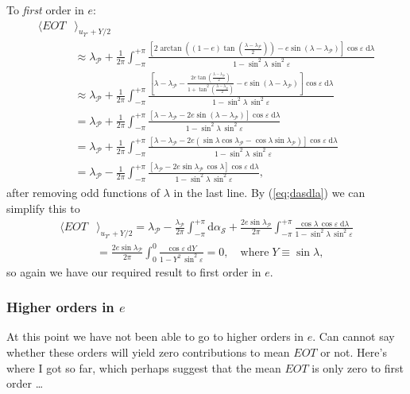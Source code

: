 \documentclass[]{AGUJournal}
\newcommand{\beq}{\begin{equation}}
\newcommand{\eeq}{\end{equation}}
\newcommand{\sun}{{\mathcal{S}}}
\newcommand{\peri}{{\mathcal{P}}}
\newcommand{\fpoa}{\Upsilon}
\newcommand{\al}{\alpha}
\newcommand{\la}{\lambda}
\newcommand{\eps}{\varepsilon}
\newcommand{\cob}{{\cos\eps}}
\newcommand{\dee}{\text{d}}
\newcommand{\dla}{\dee \la}
\begin{document}
To {\em first\/} order in $e$:
\beq
\begin{split}
\langle EOT & \rangle_{u_{\fpoa'}+Y/2} \\
& \approx \la_\peri + \frac{1}{2\pi} \int_{-\pi}^{+\pi} \frac{\left[2\arctan\left( (1-e)\tan\left(\frac{\la - \la_\peri}{2}\right) \right) - e\sin(\la - \la_\peri) \right] \cob\; \dla} {1 - \sin^2\!\la \,\sin^2\eps} \\
& \approx \la_\peri + \frac{1}{2\pi} \int_{-\pi}^{+\pi} \frac{\left[\la - \la_\peri - \frac{2e \tan\left(\frac{\la - \la_\peri}{2}\right)}{1 +  \tan^2\left(\frac{\la - \la_\peri}{2}\right)}
  - e\sin(\la - \la_\peri) \right] \cob\; \dla} {1 - \sin^2\!\la \,\sin^2\eps} \\
& = \la_\peri + \frac{1}{2\pi} \int_{-\pi}^{+\pi} \frac{\left[\la - \la_\peri - 2e\sin(\la - \la_\peri) \right] \cob\; \dla} {1 - \sin^2\!\la \,\sin^2\eps} \\ 
& = \la_\peri + \frac{1}{2\pi} \int_{-\pi}^{+\pi} \frac{\left[\la - \la_\peri - 2e(\sin\la\cos\la_\peri - \cos\la\sin\la_\peri) \right] \cob\; \dla} {1 - \sin^2\!\la \,\sin^2\eps} \\ 
& = \la_\peri - \frac{1}{2\pi} \int_{-\pi}^{+\pi} \frac{\left[\la_\peri - 2e\sin\la_\peri\,\cos\la \right] \cob\; \dla} {1 - \sin^2\!\la \,\sin^2\eps},
\end{split}
\eeq
after removing odd functions of $\la$ in the last line. By (\ref{eq;dasdla}) we can simplify this to
\beq
\begin{split}
\langle EOT & \rangle_{u_{\fpoa'}+Y/2}
= \la_\peri - \frac{\la_\peri}{2\pi} \int_{-\pi}^{+\pi} \dee \al_\sun + \frac{2e\sin\la_\peri}{2\pi} \int_{-\pi}^{+\pi} \frac{\cos\la \,\cob\; \dla} {1 - \sin^2\!\la \,\sin^2\eps} \\
& = \frac{2e\sin\la_\peri}{2\pi} \int_0^0 \frac{\cob\; \dee Y} {1 - Y^2 \,\sin^2\eps} = 0, \quad \text{where}\;Y \equiv \sin\la,
\end{split}
\eeq
so again we have our required result to first order in $e$.

\subsubsection{Higher orders in $e$}

At this point we have not been able to go to higher orders in $e$. 
Can cannot say whether these orders will yield zero contributions to mean $EOT$ or not.
Here's where I got so far, which perhaps suggest that the mean $EOT$ is only zero to first order \ldots
\end{document}
